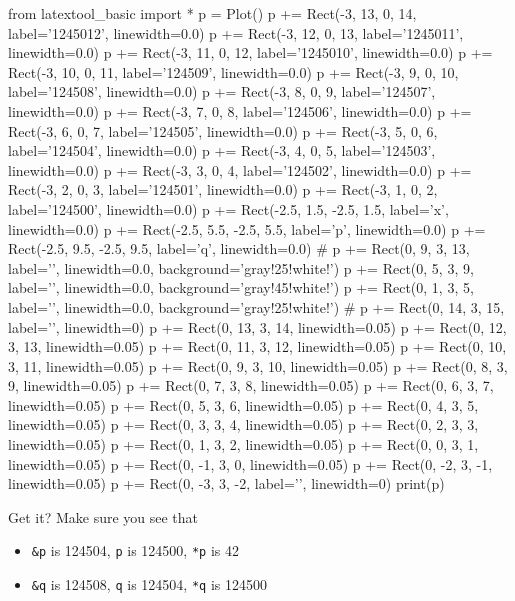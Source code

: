 \begin{python}
from latextool_basic import *
p = Plot()
p += Rect(-3, 13, 0, 14, label='1245012', linewidth=0.0)
p += Rect(-3, 12, 0, 13, label='1245011', linewidth=0.0)
p += Rect(-3, 11, 0, 12, label='1245010', linewidth=0.0)
p += Rect(-3, 10, 0, 11, label='124509', linewidth=0.0)
p += Rect(-3, 9, 0, 10, label='124508', linewidth=0.0)
p += Rect(-3, 8, 0, 9, label='124507', linewidth=0.0)
p += Rect(-3, 7, 0, 8, label='124506', linewidth=0.0)
p += Rect(-3, 6, 0, 7, label='124505', linewidth=0.0)
p += Rect(-3, 5, 0, 6, label='124504', linewidth=0.0)
p += Rect(-3, 4, 0, 5, label='124503', linewidth=0.0)
p += Rect(-3, 3, 0, 4, label='124502', linewidth=0.0)
p += Rect(-3, 2, 0, 3, label='124501', linewidth=0.0)
p += Rect(-3, 1, 0, 2, label='124500', linewidth=0.0)
p += Rect(-2.5, 1.5, -2.5, 1.5, label='x', linewidth=0.0)
p += Rect(-2.5, 5.5, -2.5, 5.5, label='p', linewidth=0.0)
p += Rect(-2.5, 9.5, -2.5, 9.5, label='q', linewidth=0.0)
#
p += Rect(0, 9, 3, 13, label='', linewidth=0.0, background='gray!25!white!')
p += Rect(0, 5, 3, 9, label='', linewidth=0.0, background='gray!45!white!')
p += Rect(0, 1, 3, 5, label='', linewidth=0.0, background='gray!25!white!')
#
p += Rect(0, 14, 3, 15, label='', linewidth=0)
p += Rect(0, 13, 3, 14, linewidth=0.05)
p += Rect(0, 12, 3, 13, linewidth=0.05)
p += Rect(0, 11, 3, 12, linewidth=0.05)
p += Rect(0, 10, 3, 11, linewidth=0.05)
p += Rect(0, 9, 3, 10,  linewidth=0.05)
p += Rect(0, 8, 3, 9,  linewidth=0.05)
p += Rect(0, 7, 3, 8,  linewidth=0.05)
p += Rect(0, 6, 3, 7,  linewidth=0.05)
p += Rect(0, 5, 3, 6,  linewidth=0.05)
p += Rect(0, 4, 3, 5,  linewidth=0.05)
p += Rect(0, 3, 3, 4,  linewidth=0.05)
p += Rect(0, 2, 3, 3,  linewidth=0.05)
p += Rect(0, 1, 3, 2,  linewidth=0.05)
p += Rect(0, 0, 3, 1,  linewidth=0.05)
p += Rect(0, -1, 3, 0,  linewidth=0.05)
p += Rect(0, -2, 3, -1,  linewidth=0.05)
p += Rect(0, -3, 3, -2, label='', linewidth=0)
print(p)
\end{python}

Get it? Make sure you see that

\begin{itemize}

\item
  \texttt{\&p} is 124504, \texttt{p} is 124500, \texttt{*p} is 42
\item
  \texttt{\&q} is 124508, \texttt{q} is 124504, \texttt{*q} is 124500
\end{itemize}

